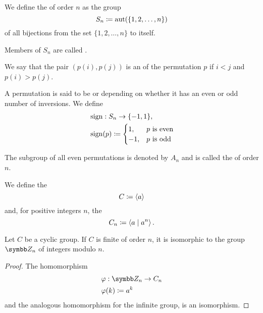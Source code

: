 \begin{definition}\label{def:symmetric_group}
  We define the  of order \( n \) as the group
  \begin{equation*}
    S_n \coloneqq \operatorname{aut}(\{ 1, 2, \ldots, n \})
  \end{equation*}
  of all bijections from the set \( \{ 1, 2, \ldots, n \} \) to itself.

  Members of \( S_n \) are called .

  We say that the pair \( (p(i), p(j)) \) is an  of the permutation \( p \) if \( i < j \) and \( p(i) > p(j) \).

  A permutation is said to be  or  depending on whether it has an even or odd number of inversions. We define
  \begin{align*}
    &\operatorname{sign}: S_n \to \{ -1, 1 \}, \\
    &\operatorname{sign}(p) \coloneqq \begin{cases}
      1, &p \text{ is even} \\
      -1, &p \text{ is odd}
    \end{cases}
  \end{align*}

  The subgroup of all even permutations is denoted by \( A_n \) and is called the  of order \( n \).
\end{definition}

\begin{definition}\label{def:cyclic_group}
  We define the 
  \begin{equation*}
    C \coloneqq \left\langle a \right\rangle
  \end{equation*}
  and, for positive integers \( n \), the 
  \begin{equation*}
    C_n \coloneqq \left\langle a \mid a^n \right\rangle.
  \end{equation*}
\end{definition}

\begin{proposition}\label{thm:cyclic_group_isomorphic_to_integers_modulo_n}
  Let \( C \) be a cyclic group. If \( C \) is finite of order \( n \), it is isomorphic to the group \( \Z_n \) of integers modulo \( n \).
\end{proposition}
\begin{proof}
  The homomorphism
  \begin{align*}
    &\varphi: \Z_n \to C_n \\
    &\varphi(k) \coloneqq a^k
  \end{align*}
  and the analogous homomorphism for the infinite group, is an isomorphism.
\end{proof}

